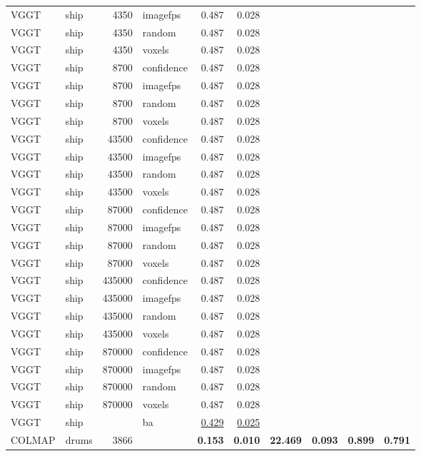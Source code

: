 \begin{table}[H]
\begin{tabular}{llrlrrrrrr}
VGGT & ship & 4350 & imagefps & 0.487 & 0.028 &  &  &  &  \\
VGGT & ship & 4350 & random & 0.487 & 0.028 &  &  &  &  \\
VGGT & ship & 4350 & voxels & 0.487 & 0.028 &  &  &  &  \\
VGGT & ship & 8700 & confidence & 0.487 & 0.028 &  &  &  &  \\
VGGT & ship & 8700 & imagefps & 0.487 & 0.028 &  &  &  &  \\
VGGT & ship & 8700 & random & 0.487 & 0.028 &  &  &  &  \\
VGGT & ship & 8700 & voxels & 0.487 & 0.028 &  &  &  &  \\
VGGT & ship & 43500 & confidence & 0.487 & 0.028 &  &  &  &  \\
VGGT & ship & 43500 & imagefps & 0.487 & 0.028 &  &  &  &  \\
VGGT & ship & 43500 & random & 0.487 & 0.028 &  &  &  &  \\
VGGT & ship & 43500 & voxels & 0.487 & 0.028 &  &  &  &  \\
VGGT & ship & 87000 & confidence & 0.487 & 0.028 &  &  &  &  \\
VGGT & ship & 87000 & imagefps & 0.487 & 0.028 &  &  &  &  \\
VGGT & ship & 87000 & random & 0.487 & 0.028 &  &  &  &  \\
VGGT & ship & 87000 & voxels & 0.487 & 0.028 &  &  &  &  \\
VGGT & ship & 435000 & confidence & 0.487 & 0.028 &  &  &  &  \\
VGGT & ship & 435000 & imagefps & 0.487 & 0.028 &  &  &  &  \\
VGGT & ship & 435000 & random & 0.487 & 0.028 &  &  &  &  \\
VGGT & ship & 435000 & voxels & 0.487 & 0.028 &  &  &  &  \\
VGGT & ship & 870000 & confidence & 0.487 & 0.028 &  &  &  &  \\
VGGT & ship & 870000 & imagefps & 0.487 & 0.028 &  &  &  &  \\
VGGT & ship & 870000 & random & 0.487 & 0.028 &  &  &  &  \\
VGGT & ship & 870000 & voxels & 0.487 & 0.028 &  &  &  &  \\
VGGT & ship &  & ba & \underline{0.429} & \underline{0.025} &  &  &  &  \\
\midrule
COLMAP & drums & 3866 &  & \textbf{0.153} & \textbf{0.010} & \textbf{22.469} & \textbf{0.093} & \textbf{0.899} & \textbf{0.791} \\

\end{tabular}
\end{table}

